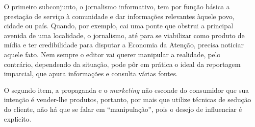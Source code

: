 O primeiro subconjunto, o jornalismo informativo, tem por função básica
a prestação de serviço à comunidade e dar informações relevantes àquele
povo, cidade ou país. Quando, por exemplo, cai uma ponte que obstrui a
principal avenida de uma localidade, o jornalismo, até para se
viabilizar como produto de mídia e ter credibilidade para disputar a
Economia da Atenção, precisa noticiar aquele fato. Nem sempre o editor
vai querer manipular a realidade, pelo contrário, dependendo da
situação, pode pôr em prática o ideal da reportagem imparcial, que apura
informações e consulta várias fontes.

O segundo item, a propaganda e o \emph{marketing} não esconde do
consumidor que sua intenção é vender-lhe produtos, portanto, por mais
que utilize técnicas de sedução do cliente, não há que se falar em
``manipulação'', pois o desejo de influenciar é explícito.

